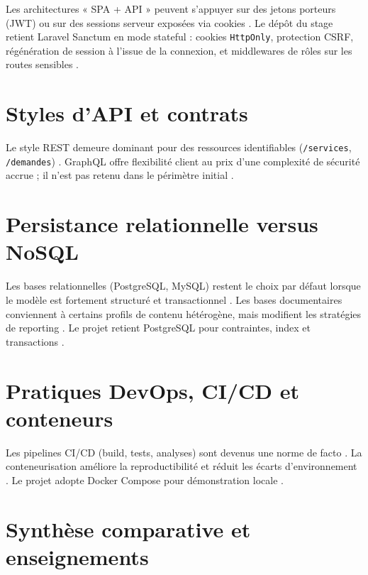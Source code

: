 Les architectures « SPA + API » peuvent s'appuyer sur des jetons porteurs (JWT) ou sur des sessions serveur exposées via cookies \cite{rfc7519,sanctumdoc}. Le dépôt du stage retient Laravel Sanctum en mode stateful : cookies \texttt{HttpOnly}, protection CSRF, régénération de session à l'issue de la connexion, et middlewares de rôles sur les routes sensibles \cite{owasp2021,laraveldoc}.

\section{Styles d'API et contrats}

Le style REST demeure dominant pour des ressources identifiables (\texttt{/services}, \texttt{/demandes}) \cite{fielding2000,rfc7231}. GraphQL offre flexibilité client au prix d'une complexité de sécurité accrue ; il n'est pas retenu dans le périmètre initial \cite{kleppmann2017}.

\section{Persistance relationnelle versus NoSQL}

Les bases relationnelles (PostgreSQL, MySQL) restent le choix par défaut lorsque le modèle est fortement structuré et transactionnel \cite{date2003,postgresdoc}. Les bases documentaires conviennent à certains profils de contenu hétérogène, mais modifient les stratégies de reporting \cite{kleppmann2017}. Le projet retient PostgreSQL pour contraintes, index et transactions \cite{postgresdoc}.

\section{Pratiques DevOps, CI/CD et conteneurs}

Les pipelines CI/CD (build, tests, analyses) sont devenus une norme de facto \cite{sommerville2016}. La conteneurisation améliore la reproductibilité et réduit les écarts d'environnement \cite{dockerdoc,twelvefactor}. Le projet adopte Docker Compose pour démonstration locale \cite{dockerdoc}.

\section{Synthèse comparative et enseignements}

